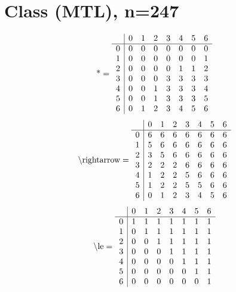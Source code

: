 \documentclass[11pt]{article}
\begin{document}
\section{Class (MTL), n=247}
\[\text{*} = 
\begin{array}{r | r r r r r r r}
 & 0 & 1 & 2 & 3 & 4 & 5 & 6 \\ \hline
0 & 0 & 0 & 0 & 0 & 0 & 0 & 0 \\
1 & 0 & 0 & 0 & 0 & 0 & 0 & 1 \\
2 & 0 & 0 & 0 & 0 & 1 & 1 & 2 \\
3 & 0 & 0 & 0 & 3 & 3 & 3 & 3 \\
4 & 0 & 0 & 1 & 3 & 3 & 3 & 4 \\
5 & 0 & 0 & 1 & 3 & 3 & 3 & 5 \\
6 & 0 & 1 & 2 & 3 & 4 & 5 & 6 \\
\end{array}
\]
\[\text{\textbackslash rightarrow} = 
\begin{array}{r | r r r r r r r}
 & 0 & 1 & 2 & 3 & 4 & 5 & 6 \\ \hline
0 & 6 & 6 & 6 & 6 & 6 & 6 & 6 \\
1 & 5 & 6 & 6 & 6 & 6 & 6 & 6 \\
2 & 3 & 5 & 6 & 6 & 6 & 6 & 6 \\
3 & 2 & 2 & 2 & 6 & 6 & 6 & 6 \\
4 & 1 & 2 & 2 & 5 & 6 & 6 & 6 \\
5 & 1 & 2 & 2 & 5 & 5 & 6 & 6 \\
6 & 0 & 1 & 2 & 3 & 4 & 5 & 6 \\
\end{array}
\]
\[\text{\textbackslash le} = 
\begin{array}{r | r r r r r r r}
 & 0 & 1 & 2 & 3 & 4 & 5 & 6 \\ \hline
0 & 1 & 1 & 1 & 1 & 1 & 1 & 1 \\
1 & 0 & 1 & 1 & 1 & 1 & 1 & 1 \\
2 & 0 & 0 & 1 & 1 & 1 & 1 & 1 \\
3 & 0 & 0 & 0 & 1 & 1 & 1 & 1 \\
4 & 0 & 0 & 0 & 0 & 1 & 1 & 1 \\
5 & 0 & 0 & 0 & 0 & 0 & 1 & 1 \\
6 & 0 & 0 & 0 & 0 & 0 & 0 & 1 \\
\end{array}
\]
\end{document}
